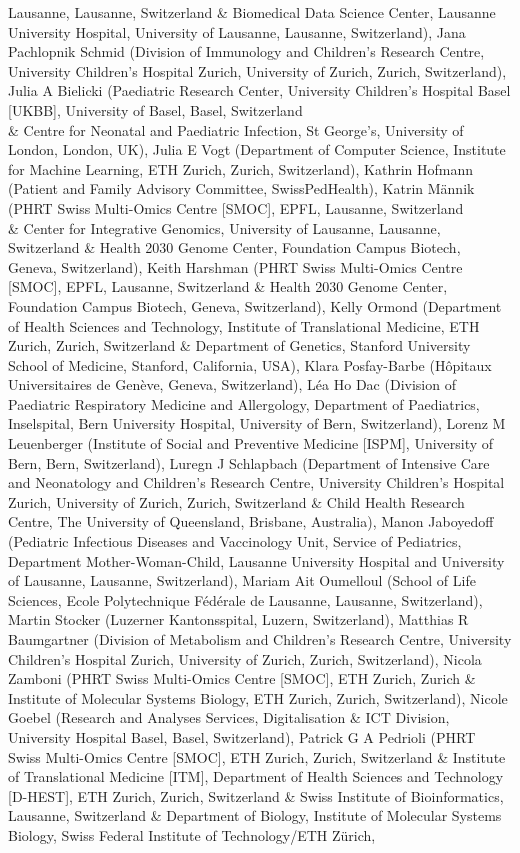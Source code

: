Lausanne, Lausanne, Switzerland \& Biomedical Data Science Center, Lausanne University Hospital, University of Lausanne, Lausanne, Switzerland), Jana Pachlopnik Schmid (Division of Immunology and Children’s Research Centre, University Children’s Hospital Zurich, University of Zurich, Zurich, Switzerland), Julia A Bielicki (Paediatric Research Center, University Children's Hospital Basel [UKBB], University of Basel, Basel, Switzerland \\& Centre for Neonatal and Paediatric Infection, St George’s, University of London, London, UK), Julia E Vogt (Department of Computer Science, Institute for Machine Learning, ETH Zurich, Zurich, Switzerland), Kathrin Hofmann (Patient and Family Advisory Committee, SwissPedHealth), Katrin Männik (PHRT Swiss Multi-Omics Centre [SMOC], EPFL, Lausanne, Switzerland \\& Center for Integrative Genomics, University of Lausanne, Lausanne, Switzerland \& Health 2030 Genome Center, Foundation Campus Biotech, Geneva, Switzerland), Keith Harshman (PHRT Swiss Multi-Omics Centre [SMOC], EPFL, Lausanne, Switzerland \& Health 2030 Genome Center, Foundation Campus Biotech, Geneva, Switzerland), Kelly Ormond (Department of Health Sciences and Technology, Institute of Translational Medicine, ETH Zurich, Zurich, Switzerland \& Department of Genetics, Stanford University School of Medicine, Stanford, California, USA), Klara Posfay-Barbe (Hôpitaux Universitaires de Genève, Geneva, Switzerland), Léa Ho Dac (Division of Paediatric Respiratory Medicine and Allergology, Department of Paediatrics, Inselspital, Bern University Hospital, University of Bern, Switzerland), Lorenz M Leuenberger (Institute of Social and Preventive Medicine [ISPM], University of Bern, Bern, Switzerland), Luregn J Schlapbach (Department of Intensive Care and Neonatology and Children’s Research Centre, University Children’s Hospital Zurich, University of Zurich, Zurich, Switzerland \& Child Health Research Centre, The University of Queensland, Brisbane, Australia), Manon Jaboyedoff (Pediatric Infectious Diseases and Vaccinology Unit, Service of Pediatrics, Department Mother-Woman-Child, Lausanne University Hospital and University of Lausanne, Lausanne, Switzerland), Mariam Ait Oumelloul (School of Life Sciences, Ecole Polytechnique Fédérale de Lausanne, Lausanne, Switzerland), Martin Stocker (Luzerner Kantonsspital, Luzern, Switzerland), Matthias R Baumgartner (Division of Metabolism and Children’s Research Centre, University Children’s Hospital Zurich, University of Zurich, Zurich, Switzerland), Nicola Zamboni (PHRT Swiss Multi-Omics Centre [SMOC], ETH Zurich, Zurich \& Institute of Molecular Systems Biology, ETH Zurich, Zurich, Switzerland), Nicole Goebel (Research and Analyses Services, Digitalisation \& ICT Division, University Hospital Basel, Basel, Switzerland), Patrick G A Pedrioli (PHRT Swiss Multi-Omics Centre [SMOC], ETH Zurich, Zurich, Switzerland \& Institute of Translational Medicine [ITM], Department of Health Sciences and Technology [D-HEST], ETH Zurich, Zurich, Switzerland \& Swiss Institute of Bioinformatics, Lausanne, Switzerland \& Department of Biology, Institute of Molecular Systems Biology, Swiss Federal Institute of Technology/ETH Zürich, 